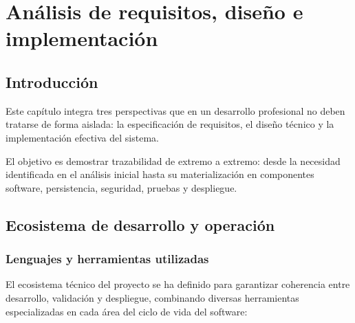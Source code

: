 \chapter{An\'alisis de requisitos, dise\~no e implementaci\'on}\label{requisitos}
\makeatletter
{}
\makeatother

\FloatBarrier
\section{Introducci\'on}

Este cap\'itulo integra tres perspectivas que en un desarrollo profesional no deben
tratarse de forma aislada: la especificaci\'on de requisitos, el dise\~no t\'ecnico y la
implementaci\'on efectiva del sistema.

El objetivo es demostrar trazabilidad de extremo a extremo: desde la necesidad
identificada en el an\'alisis inicial hasta su materializaci\'on en componentes software,
persistencia, seguridad, pruebas y despliegue.

\FloatBarrier
\section{Ecosistema de desarrollo y operaci\'on}

\subsection{Lenguajes y herramientas utilizadas}

El ecosistema t\'ecnico del proyecto se ha definido para garantizar coherencia entre desarrollo, validaci\'on y despliegue, combinando diversas herramientas especializadas en cada \'area del ciclo de vida del software:

